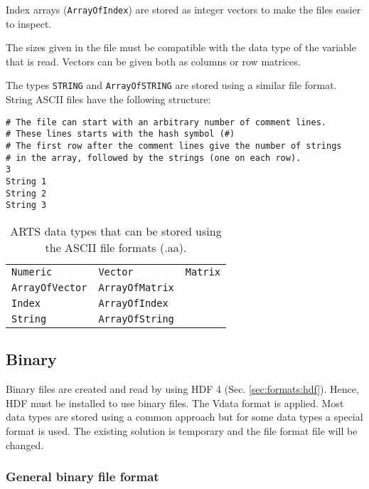  \noindent
 Index arrays (\verb|ArrayOfIndex|) are stored as integer vectors to
 make the files easier to inspect.
     
 The sizes given in the file must be compatible with the data type
 of the variable that is read. Vectors can be given both as
 columns or row matrices.
 
 The types \verb|STRING| and \verb|ArrayOfSTRING| are stored using a
 similar file format. String ASCII files have the following structure:
 {\footnotesize \begin{verbatim} 
# The file can start with an arbitrary number of comment lines.
# These lines starts with the hash symbol (#)
# The first row after the comment lines give the number of strings
# in the array, followed by the strings (one on each row).  
3
String 1
String 2
String 3
 \end{verbatim} 
}

 \begin{table}[t]
  \begin{tabular}{p{4cm} p{4cm} p{4cm}}
   \verb|Numeric|        & \verb|Vector|         & \verb|Matrix|          \\
   \verb|ArrayOfVector|  & \verb|ArrayOfMatrix|  &                        \\
   \verb|Index|          & \verb|ArrayOfIndex|  &                        \\
   \verb|String|          & \verb|ArrayOfString|  &                        \\
  \end{tabular}
  \caption{ARTS data types that can be stored using the ASCII
           file formats (.aa).}
  \label{table:format:aa}
 \end{table}
 

\subsection{Binary}
 \label{sec:formats:file:binary}
  
 Binary files are created and read by using HDF 4 (Sec.
 \ref{sec:formats:hdf}). Hence, HDF must be installed to use binary
 files. The Vdata format is applied. Most data types are stored using
 a common approach but for some data types a special format is used.
 The existing solution is temporary and the file format file will be
 changed.


\subsubsection{General binary file format}
 \label{sec:formats:file:binary:general}
 
